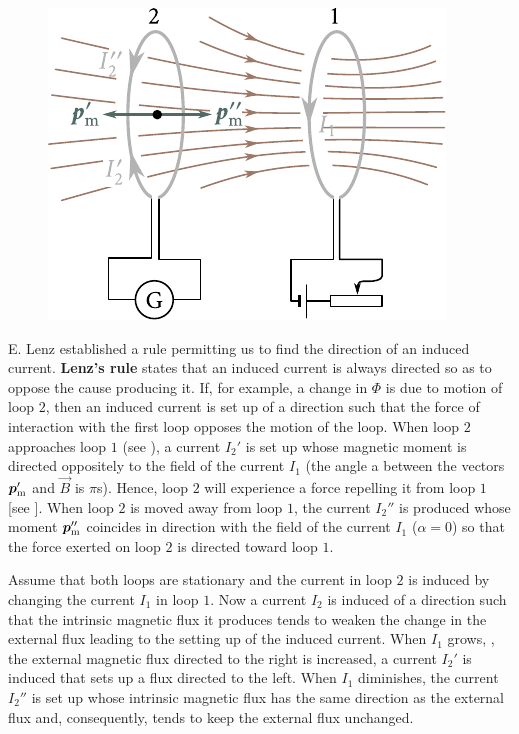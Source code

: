 \begin{figure}[t]
	\begin{center}
		\includegraphics[scale=1]{figures/ch_08/fig_8_1.pdf}
		\caption[]{}
		\label{fig:8_1}
	\end{center}
	\vspace{-0.8cm}
\end{figure}

E. Lenz established a rule permitting us to find the direction of an induced current.
\textbf{Lenz's rule} states that an induced current is always directed so as to oppose the cause producing it.
If, for example, a change in $\Phi$ is due to motion of loop $2$, then an induced current is set up of a direction such that the force of interaction with the first loop opposes the motion of the loop.
When loop $2$ approaches loop $1$ (see ), a current $I_2'$ is set up whose magnetic moment is directed oppositely to the field of the current $I_1$ (the angle a between the vectors $\boldsymbol{p}_{\text{m}}'$ and $\vec{B}$ is $\pi$s).
Hence, loop $2$ will experience a force repelling it from loop $1$ [see ].
When loop $2$ is moved away from loop $1$, the current $I_2''$ is produced whose moment $\boldsymbol{p}_{\text{m}}''$ coincides in direction with the field of the current $I_1$ ($\alpha=0$) so that the force exerted on loop $2$ is directed toward loop $1$.

Assume that both loops are stationary and the current in loop $2$ is induced by changing the current $I_1$ in loop $1$.
Now a current $I_2$ is induced of a direction such that the intrinsic magnetic flux it produces tends to weaken the change in the external flux leading to the setting up of the induced current.
When $I_1$ grows, \ie, the external magnetic flux directed to the right is increased, a current $I_2'$ is induced that sets up a flux directed to the left.
When $I_1$ diminishes, the current $I_2''$ is set up whose intrinsic magnetic flux has the same direction as the external flux and, consequently, tends to keep the external flux unchanged.

